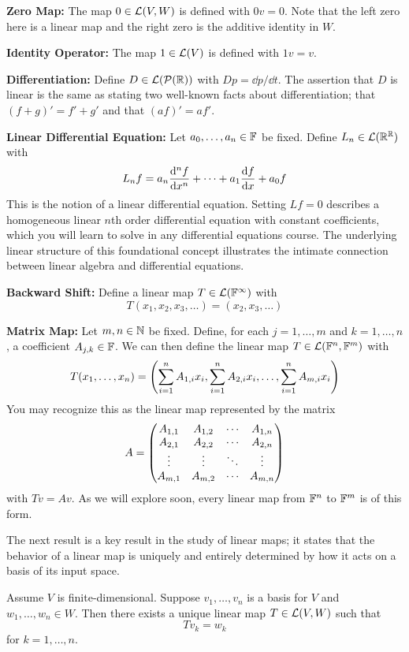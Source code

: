 \begin{example}
    \textbf{Zero Map:} The map $0 \in \mathcal{L}(V,W)$ is defined with $0v = 0$. Note that the left zero here is a linear map and the right zero is the additive identity in $W$.

    \textbf{Identity Operator:} The map $1\in\mathcal{L}(V)$ is defined with $1v = v$. 

    \textbf{Differentiation:} Define $D\in \mathcal{L}(\mathcal{P}(\mathbb{R}))$ with $Dp = \dd p/\dd t$. The assertion that $D$ is linear is the same as stating two well-known facts about differentiation; that $(f+g)' = f'+g'$ and that $(af)' = af'$.

    \textbf{Linear Differential Equation:} Let $a_0, \dots, a_n \in \mathbb F$ be fixed. Define $L_n \in \mathcal{L}(\mathbb{R}^{\mathbb{R}})$ with 
    \[ L_nf = a_n \dv[n]{f}{x} + \cdots + a_1\dv{f}{x} + a_0 f\]
    This is the notion of a linear differential equation. Setting $Lf = 0$ describes a homogeneous linear $n$th order differential equation with constant coefficients, which you will learn to solve in any differential equations course. The underlying linear structure of this foundational concept illustrates the intimate connection between linear algebra and differential equations.

    \textbf{Backward Shift:} Define a linear map $T\in \mathcal{L}(\mathbb F^\infty)$ with
    \[ T(x_1, x_2, x_3, \dots) = (x_2, x_3, \dots) \]

    \textbf{Matrix Map:} Let $m,n\in \mathbb{N}$ be fixed. Define, for each $j = 1, \dots, m$ and $k = 1, \dots, n$, a coefficient $A_{j,k}\in \mathbb F$. We can then define the linear map $T\in \mathcal{L}(\mathbb F^n, \mathbb F^m)$ with
    \[ T(x_1, \dots, x_n) = \pqty{\sum_{i=1}^n A_{1,i}x_i, \sum_{i=1}^n A_{2,i}x_i, \dots, \sum_{i=1}^n A_{m,i}x_i}\]
    You may recognize this as the linear map represented by the matrix
    \[ A = \begin{pmatrix}A_{1,1} & A_{1,2} & \cdots & A_{1,n} \\
                 A_{2,1} & A_{2,2} & \cdots & A_{2,n} \\
                 \vdots & \vdots & \ddots & \vdots \\
                 A_{m,1} & A_{m,2} & \cdots & A_{m,n}\end{pmatrix}\]
    with $Tv = Av$. As we will explore soon, every linear map from $\mathbb F^n$ to $\mathbb F^m$ is of this form.
\end{example}
The next result is a key result in the study of linear maps; it states that the behavior of a linear map is uniquely and entirely determined by how it acts on a basis of its input space. 
\begin{theorem}
    Assume $V$ is finite-dimensional. Suppose $v_1, \dots, v_n$ is a basis for $V$ and $w_1, \dots, w_n \in W$. Then there exists a unique linear map $T\in \mathcal{L}(V,W)$ such that
    \[ Tv_k = w_k\]
    for $k= 1, \dots, n$.
\end{theorem}
